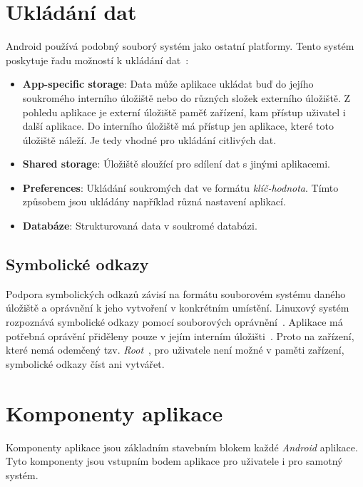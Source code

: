 \section{Ukládání dat}
Android používá podobný souborý systém jako ostatní platformy. Tento systém poskytuje řadu možností k ukládání dat~:
\begin{itemize}
    \item \textbf{App-specific storage}: Data může aplikace ukládat buď do jejího soukromého interního úložiště nebo do různých složek externího úložiště. Z pohledu aplikace je externí úložiště paměť zařízení, kam přístup uživatel i další aplikace. Do interního úložiště má přístup jen aplikace, které toto úložiště náleží. Je tedy vhodné pro ukládání citlivých dat.
    \item \textbf{Shared storage}: Úložiště sloužící pro sdílení dat s jinými aplikacemi.
    \item \textbf{Preferences}\label{preferences}: Ukládání soukromých dat ve formátu \emph{klíč-hodnota}. Tímto způsobem jsou ukládány například různá nastavení aplikací.
    \item \textbf{Databáze}: Strukturovaná data v soukromé databázi.
\end{itemize}


    \subsection{Symbolické odkazy}
    Podpora symbolických odkazů závisí na formátu souborovém systému daného úložiště a oprávnění k jeho vytvoření v konkrétním umístění. Linuxový systém rozpoznává symbolické odkazy pomocí souborových oprávnění~. Aplikace má potřebná oprávění přiděleny pouze v jejím interním úložišti~. Proto na zařízení, které nemá odemčený tzv. \emph{Root}~, pro uživatele není možné v paměti zařízení, symbolické odkazy číst ani vytvářet.

\newpage
\section{Komponenty aplikace}
Komponenty aplikace jsou základním stavebním blokem každé \emph{Android} aplikace. Tyto komponenty jsou vstupním bodem aplikace pro uživatele i pro samotný systém.

